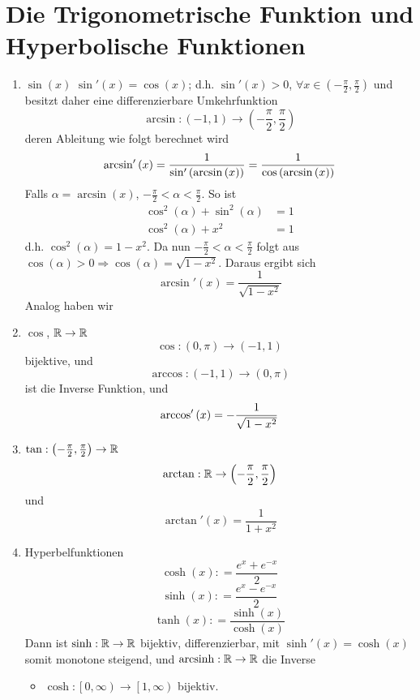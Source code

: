 \section{Die Trigonometrische Funktion und Hyperbolische Funktionen}
\begin{enumerate}
\item $\sin(x)$
$\sin'(x)=\cos(x)$; d.h. $\sin'(x)>0$, $\forall x\in\left( -\frac{\pi}{2},\frac{\pi}{2}\right)$ und besitzt daher eine differenzierbare Umkehrfunktion 
\[\arcsin :\left( { - 1,1} \right) \to \left( { - \frac{\pi }{2},\frac{\pi }{2}} \right)\]
deren Ableitung wie folgt berechnet wird
\[{\mathop{\rm arcsin'}\nolimits} \left( x \right) = \frac{1}{{{\mathop{\rm sin'}\nolimits} \left( {\arcsin \left( x \right)} \right)}} = \frac{1}{{\cos \left( {\arcsin \left( x \right)} \right)}}\]
Falls $\alpha=\arcsin(x)$, $-\frac{\pi}{2}<\alpha <\frac{\pi}{2}$. So ist 
\begin{align*}
{\cos ^2}\left( \alpha  \right) + {\sin ^2}\left( \alpha  \right) &= 1\\
{\cos ^2}\left( \alpha  \right) + {x^2} &= 1
\end{align*}
d.h. $\cos^2\left( \alpha  \right)=1-x^2$. Da nun $-\frac{\pi}{2}<\alpha <\frac{\pi}{2}$ folgt aus $\cos\left( \alpha  \right)>0\Rightarrow\cos\left( \alpha  \right)=\sqrt{1-x^2}$. Daraus ergibt sich \[\arcsin'\left( x\right)=\frac{1}{\sqrt{1-x^2}}\]
Analog haben wir
\item $\cos$, $\mathbb{R}\to\mathbb{R}$
\[\cos :\left( {0,\pi } \right) \to \left( { - 1,1} \right)\]
bijektive, und
\[\arccos :\left( { - 1,1} \right) \to \left( {0,\pi } \right)\]
ist die Inverse Funktion, und 
\[{\mathop{\rm arccos'}\nolimits} \left( x \right) =  - \frac{1}{{\sqrt {1 - {x^2}} }}\]
\item $\tan:\left( -\frac{\pi}{2},\frac{\pi}{2}\right)\to\mathbb{R}$
\[\arctan:\mathbb{R}\to\left( -\frac{\pi}{2},\frac{\pi}{2}\right)\]
und
\[\arctan'(x)=\frac{1}{1+x^2}\]
\item Hyperbelfunktionen 
\[\cosh \left( x \right): = \frac{{{e^x} + {e^{ - x}}}}{2}\]
\[\sinh \left( x \right): = \frac{{{e^x} - {e^{ - x}}}}{2}\]
\[\tanh \left( x \right): = \frac{{\sinh \left( x \right)}}{{\cosh \left( x \right)}}\]
Dann ist $\sinh:\mathbb{R}\to\mathbb{R}$ bijektiv, differenzierbar, mit $\sinh'(x)=\cosh(x)$ somit monotone steigend, und $\operatorname{arcsinh}:\mathbb{R}\to\mathbb{R}$ die Inverse
\begin{itemize}
\item $\cosh :\left[ {0,\infty } \right) \to \left[ {1,\infty } \right)$ bijektiv.\\

\end{itemize}
\end{enumerate}
